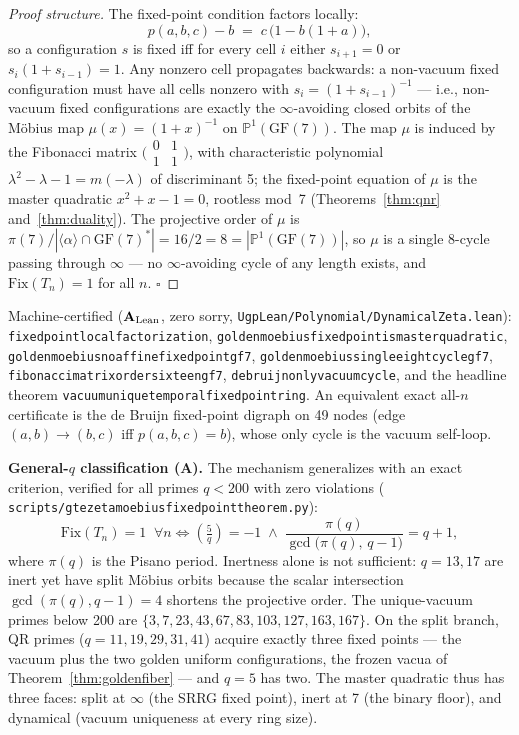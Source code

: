 \documentclass[11pt]{article}
\theoremstyle{remark}
\newcommand{\GF}[1]{\ensuremath{\mathrm{GF}(#1)}}
\newcommand{\lean}[1]{%
  \penalty-100
  \begingroup\def\_{\textunderscore\allowbreak}\texttt{#1}\endgroup}
\newcommand{\CatA}{\textbf{A}}
\newcommand{\CatAL}{\texorpdfstring{\ensuremath{\textbf{A}_{\rm Lean}}}{A-Lean}}
\begin{document}
\begin{proof}[Proof structure]
The fixed-point condition factors locally:
\[
  p(a,b,c) - b \;=\; c\,\bigl(1 - b(1+a)\bigr),
\]
so a configuration $s$ is fixed iff for every cell $i$ either
$s_{i+1} = 0$ or $s_i(1 + s_{i-1}) = 1$. Any nonzero cell propagates
backwards: a non-vacuum fixed configuration must have all cells nonzero
with $s_i = (1 + s_{i-1})^{-1}$ --- i.e., non-vacuum fixed configurations
are exactly the $\infty$-avoiding closed orbits of the M\"obius map
$\mu(x) = (1+x)^{-1}$ on $\mathbb{P}^1(\GF{7})$. The map $\mu$ is induced
by the Fibonacci matrix
$\bigl(\begin{smallmatrix}0&1\\1&1\end{smallmatrix}\bigr)$, with
characteristic polynomial $\lambda^2 - \lambda - 1 = m(-\lambda)$ of
discriminant 5; the fixed-point equation of $\mu$ is the master quadratic
$x^2 + x - 1 = 0$, rootless mod~7 (Theorems~\ref{thm:qnr}
and~\ref{thm:duality}). The projective order of $\mu$ is
$\pi(7)/|\langle\alpha\rangle \cap \GF{7}^*| = 16/2 = 8 =
|\mathbb{P}^1(\GF{7})|$, so $\mu$ is a single 8-cycle passing through
$\infty$ --- no $\infty$-avoiding cycle of any length exists, and
$\mathrm{Fix}(T_n) = 1$ for all $n$. $\square$
\end{proof}

Machine-certified (\CatAL{}, zero sorry,
\lean{UgpLean/Polynomial/DynamicalZeta.lean}):
\lean{fixed\_point\_local\_factorization},
\lean{golden\_moebius\_fixed\_point\_is\_master\_quadratic},
\lean{golden\_moebius\_no\_affine\_fixed\_point\_gf7},
\lean{golden\_moebius\_single\_eight\_cycle\_gf7},
\lean{fibonacci\_matrix\_order\_sixteen\_gf7},
\lean{debruijn\_only\_vacuum\_cycle}, and the headline theorem
\lean{vacuum\_unique\_temporal\_fixed\_point\_ring}. An equivalent exact
all-$n$ certificate is the de Bruijn fixed-point digraph on 49 nodes
(edge $(a,b) \to (b,c)$ iff $p(a,b,c) = b$), whose only cycle is the
vacuum self-loop.

\medskip
\noindent\textbf{General-$q$ classification (\CatA{}).}
The mechanism generalizes with an exact criterion, verified for all primes
$q < 200$ with zero violations
(\lean{scripts/gte\_zeta\_moebius\_fixed\_point\_theorem.py}):
\[
  \mathrm{Fix}(T_n) = 1 \;\;\forall n
  \iff
  \left(\tfrac{5}{q}\right) = -1
  \;\wedge\;
  \frac{\pi(q)}{\gcd\bigl(\pi(q),\, q-1\bigr)} = q + 1,
\]
where $\pi(q)$ is the Pisano period. Inertness alone is not sufficient:
$q = 13, 17$ are inert yet have split M\"obius orbits because the scalar
intersection $\gcd(\pi(q), q-1) = 4$ shortens the projective order. The
unique-vacuum primes below 200 are
$\{3, 7, 23, 43, 67, 83, 103, 127, 163, 167\}$. On the split branch, QR
primes ($q = 11, 19, 29, 31, 41$) acquire exactly three fixed points ---
the vacuum plus the two golden uniform configurations, the frozen vacua of
Theorem~\ref{thm:goldenfiber} --- and $q = 5$ has two. The master quadratic
thus has three faces: split at $\infty$ (the SRRG fixed point), inert at 7
(the binary floor), and dynamical (vacuum uniqueness at every ring size).
\end{document}
